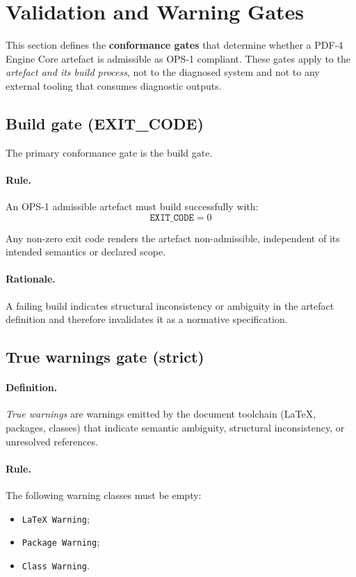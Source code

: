 ﻿\section{Validation and Warning Gates}

This section defines the \textbf{conformance gates} that determine whether a
PDF-4 Engine Core artefact is admissible as OPS-1 compliant. These gates apply to
the \emph{artefact and its build process}, not to the diagnosed system and not to
any external tooling that consumes diagnostic outputs.

\subsection{Build gate (EXIT\_CODE)}

The primary conformance gate is the build gate.

\paragraph{Rule.}
An OPS-1 admissible artefact must build successfully with:
\[
\texttt{EXIT\_CODE} = 0
\]

Any non-zero exit code renders the artefact non-admissible, independent of its
intended semantics or declared scope.

\paragraph{Rationale.}
A failing build indicates structural inconsistency or ambiguity in the artefact
definition and therefore invalidates it as a normative specification.

\subsection{True warnings gate (strict)}

\paragraph{Definition.}
\emph{True warnings} are warnings emitted by the document toolchain
(\LaTeX{}, packages, classes) that indicate semantic ambiguity, structural
inconsistency, or unresolved references.

\paragraph{Rule.}
The following warning classes must be empty:
\begin{itemize}
  \item \texttt{LaTeX Warning};
  \item \texttt{Package Warning};
  \item \texttt{Class Warning}.
\end{itemize}

